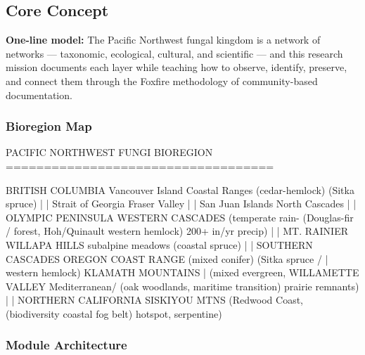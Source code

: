 \documentclass[11pt,letterpaper]{article}
\begin{document}
\subsection{Core Concept}

\begin{quotebox}
\textbf{One-line model:} The Pacific Northwest fungal kingdom is a network of networks --- taxonomic, ecological, cultural, and scientific --- and this research mission documents each layer while teaching how to observe, identify, preserve, and connect them through the Foxfire methodology of community-based documentation.
\end{quotebox}

\subsubsection{Bioregion Map}

\begin{asciibox}
PACIFIC NORTHWEST FUNGI BIOREGION
===================================

  BRITISH COLUMBIA
  Vancouver Island     Coastal Ranges
  (cedar-hemlock)      (Sitka spruce)
       |                    |
  Strait of Georgia    Fraser Valley
       |                    |
  San Juan Islands     North Cascades
       |                    |
  OLYMPIC PENINSULA    WESTERN CASCADES
  (temperate rain-     (Douglas-fir /
   forest, Hoh/Quinault western hemlock)
   200+ in/yr precip)       |
       |               MT. RAINIER
  WILLAPA HILLS        subalpine meadows
  (coastal spruce)          |
       |               SOUTHERN CASCADES
  OREGON COAST RANGE   (mixed conifer)
  (Sitka spruce /           |
   western hemlock)    KLAMATH MOUNTAINS
       |               (mixed evergreen,
  WILLAMETTE VALLEY    Mediterranean/
  (oak woodlands,      maritime transition)
   prairie remnants)        |
       |               NORTHERN CALIFORNIA
  SISKIYOU MTNS        (Redwood Coast,
  (biodiversity         coastal fog belt)
   hotspot, serpentine)
\end{asciibox}

\subsubsection{Module Architecture}
\end{document}
